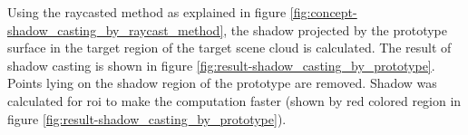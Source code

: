 Using the raycasted method as explained in figure \ref{fig:concept-shadow_casting_by_raycast_method}, the shadow projected by the prototype surface in the target region of the target scene cloud is calculated. The result of shadow casting is shown in figure \ref{fig:result-shadow_casting_by_prototype}. Points lying on the shadow region of the prototype are removed. Shadow was calculated for \acrshort{roi} to make the computation faster (shown by red colored region in figure \ref{fig:result-shadow_casting_by_prototype}).